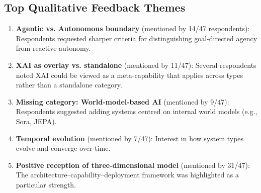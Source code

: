 \documentclass[acmlarge]{acmart}
\begin{document}
\subsection{Top Qualitative Feedback Themes}

\begin{enumerate}
  \item \textbf{Agentic vs. Autonomous boundary} (mentioned by 14/47 respondents): Respondents requested sharper criteria for distinguishing goal-directed agency from reactive autonomy.
  \item \textbf{XAI as overlay vs. standalone} (mentioned by 11/47): Several respondents noted XAI could be viewed as a meta-capability that applies across types rather than a standalone category.
  \item \textbf{Missing category: World-model-based AI} (mentioned by 9/47): Respondents suggested adding systems centred on internal world models (e.g., Sora, JEPA).
  \item \textbf{Temporal evolution} (mentioned by 7/47): Interest in how system types evolve and converge over time.
  \item \textbf{Positive reception of three-dimensional model} (mentioned by 31/47): The architecture--capability--deployment framework was highlighted as a particular strength.
\end{enumerate}
\end{document}
